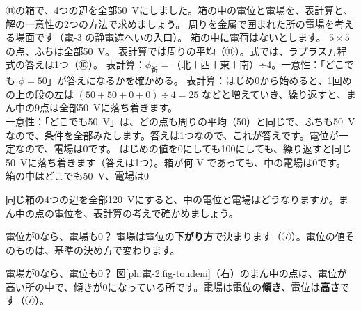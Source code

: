 \label{ph:電-2:ex12}
\begin{phreidai}[閉じた金属の箱の中]
⑪の箱で、4つの辺を全部\qty{50}{V}にしました。箱の中の電位と電場を、表計算と、解の一意性の2つの方法で求めましょう。
\phbamen
周りを金属で囲まれた所の電場を考える場面です（電-3 の静電遮へいの入口）。
\phmushi
箱の中に電荷はないとします。
\phzu
$5\times5$ の点、ふちは全部\qty{50}{V}。
\phriyu
表計算では周りの平均（⑪）。式では、ラプラス方程式の答えは1つ（⑩）。
\phtateru
表計算：$\phi_{\text{新}}=$（北＋西＋東＋南）÷4。一意性：「どこでも $\phi=50$」が答えになるかを確かめる。
\phtoku
表計算：はじめ0から始めると、1回めの上の段の左は $(50+50+0+0)\div4=25$ などと増えていき、繰り返すと、まん中の9点は全部\qty{50}{V}に落ち着きます。\\
一意性：「どこでも\qty{50}{V}」は、どの点も周りの平均（50）と同じで、ふちも\qty{50}{V}なので、条件を全部みたします。答えは1つなので、これが答えです。電位が一定なので、電場は0です。
\phtashikame
はじめの値を0にしても100にしても、繰り返すと同じ\qty{50}{V}に落ち着きます（答えは1つ）。箱が何 V であっても、中の電場は0です。
\kotae 箱の中はどこでも\qty{50}{V}、電場は0
\end{phreidai}
\begin{jibun}
同じ箱の4つの辺を全部\qty{120}{V}にすると、中の電位と電場はどうなりますか。まん中の点の電位を、表計算の考えで確かめましょう。
\end{jibun}

\begin{tsumazuki}{電位が0なら、電場も0？}
電場は電位の\textbf{下がり方}で決まります（⑦）。電位の値そのものは、基準の決め方で変わります。
\end{tsumazuki}

\begin{tsumazuki}{電場が0なら、電位も0？}
図\ref{ph:電-2:fig-toudeni}（右）のまん中の点は、電位が高い所の中で、傾きが0になっている所です。電場は電位の\textbf{傾き}、電位は\textbf{高さ}です（⑦）。
\end{tsumazuki}

